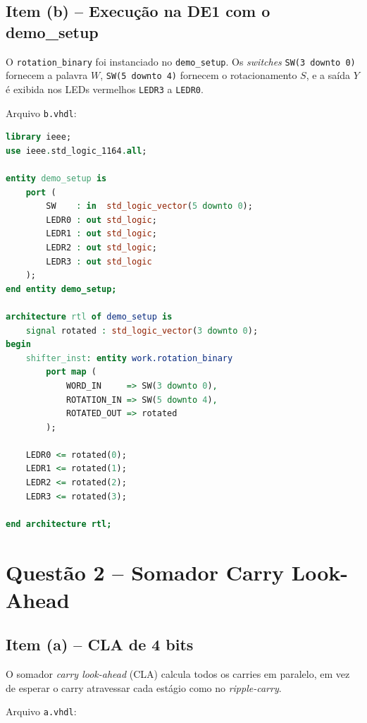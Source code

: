 \documentclass[report, 12pt]{uftreport}
\begin{document}
\section{Item (b) -- Execução na DE1 com o demo\_setup}

O \texttt{rotation\_binary} foi instanciado no \texttt{demo\_setup}. Os \textit{switches} \texttt{SW(3 downto 0)} fornecem a palavra $W$, \texttt{SW(5 downto 4)} fornecem o rotacionamento $S$, e a saída $Y$ é exibida nos LEDs vermelhos \texttt{LEDR3} a \texttt{LEDR0}.

Arquivo \texttt{b.vhdl}:

\begin{lstlisting}[language=VHDL]
library ieee;
use ieee.std_logic_1164.all;

entity demo_setup is
    port (
        SW    : in  std_logic_vector(5 downto 0);
        LEDR0 : out std_logic;
        LEDR1 : out std_logic;
        LEDR2 : out std_logic;
        LEDR3 : out std_logic
    );
end entity demo_setup;

architecture rtl of demo_setup is
    signal rotated : std_logic_vector(3 downto 0);
begin
    shifter_inst: entity work.rotation_binary
        port map (
            WORD_IN     => SW(3 downto 0),
            ROTATION_IN => SW(5 downto 4),
            ROTATED_OUT => rotated
        );

    LEDR0 <= rotated(0);
    LEDR1 <= rotated(1);
    LEDR2 <= rotated(2);
    LEDR3 <= rotated(3);

end architecture rtl;
\end{lstlisting}

\chapter{Questão 2 -- Somador Carry Look-Ahead}

\section{Item (a) -- CLA de 4 bits}

O somador \textit{carry look-ahead} (CLA) calcula todos os carries em paralelo, em vez de esperar o carry atravessar cada estágio como no \textit{ripple-carry}.

Arquivo \texttt{a.vhdl}:
\end{document}
